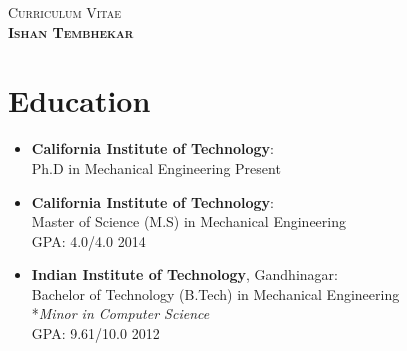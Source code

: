 \documentclass[10pt,fleqn]{article}
\renewcommand{\headrulewidth}{0.4pt}
\begin{document}

\sffamily

\begin{center}
\large %
\scshape Curriculum  Vitae \upshape\\[0.5cm]
\LARGE \textbf{Ishan Tembhekar} \small \\[0.66cm]
\end{center}




\section*{Education}
\begin{itemize}
\item[] \textbf{California Institute of Technology}:\\
		Ph.D  in Mechanical Engineering \hfill Present
\item[] \textbf{California Institute of Technology}:\\
		Master of Science (M.S) in Mechanical Engineering\\
		GPA: 4.0/4.0 \hfill 2014
\item[] \textbf{Indian Institute of Technology}, Gandhinagar:\\
		Bachelor of Technology (B.Tech) in Mechanical Engineering\\
		*\textit{Minor in Computer Science}\\
		GPA: 9.61/10.0 \hfill 2012
\end{itemize}
\end{document}
